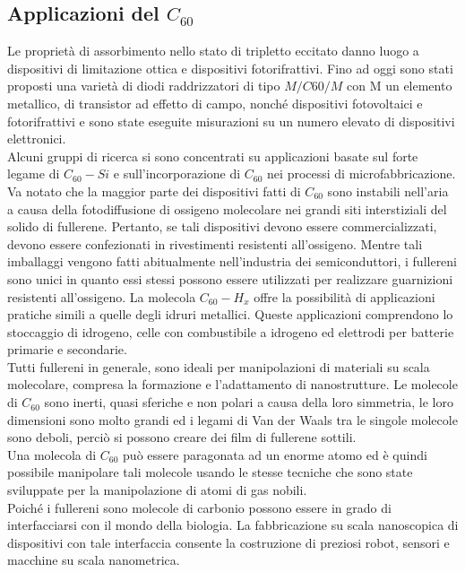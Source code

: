 \documentclass[a4paper,titlepage]{book}
\begin{document}
\subsection{Applicazioni del $C_{60}$}
Le proprietà di assorbimento nello stato di tripletto eccitato danno luogo a dispositivi di limitazione ottica e dispositivi fotorifrattivi. Fino ad oggi sono stati proposti una varietà di diodi raddrizzatori di tipo $M / C60 / M$ con M un elemento metallico, di transistor ad effetto di campo, nonché dispositivi fotovoltaici e fotorifrattivi e sono state eseguite misurazioni su un numero elevato di dispositivi elettronici. \\
Alcuni gruppi di ricerca si sono concentrati su applicazioni basate sul forte legame di $C_{60}-Si$ e sull'incorporazione di $C_{60}$ nei processi di microfabbricazione. 
Va notato che la maggior parte dei dispositivi fatti di $C_{60}$ sono instabili nell'aria a causa della fotodiffusione di ossigeno molecolare nei grandi siti interstiziali del solido di fullerene. Pertanto, se tali dispositivi devono essere commercializzati, devono essere confezionati in rivestimenti resistenti all'ossigeno. Mentre tali imballaggi vengono fatti abitualmente nell'industria dei semiconduttori, i fullereni sono unici in quanto essi stessi possono essere utilizzati per realizzare guarnizioni resistenti all'ossigeno. La molecola $C_ {60}-H_x$ offre la possibilità di applicazioni pratiche simili a quelle degli idruri metallici. Queste applicazioni comprendono lo stoccaggio di idrogeno, celle con combustibile a idrogeno ed elettrodi per batterie primarie e secondarie.\\ 
Tutti fullereni in generale, sono ideali per manipolazioni di materiali su scala molecolare, compresa la formazione e l'adattamento di nanostrutture. Le molecole di $C_{60}$ sono inerti, quasi sferiche e non polari a causa della loro simmetria, le loro dimensioni sono molto grandi ed i legami di Van der Waals tra le singole molecole sono deboli, perciò si possono creare dei film di fullerene sottili.\\
Una molecola di $C_{60}$ può essere paragonata ad un enorme atomo ed è quindi possibile manipolare tali molecole usando le stesse tecniche che sono state sviluppate per la manipolazione di atomi di gas nobili.\\
Poiché i fullereni sono molecole di carbonio possono essere in grado di interfacciarsi con il mondo della biologia. La fabbricazione su scala nanoscopica di dispositivi con tale interfaccia consente la costruzione di preziosi robot, sensori e macchine su scala nanometrica.
\end{document}
